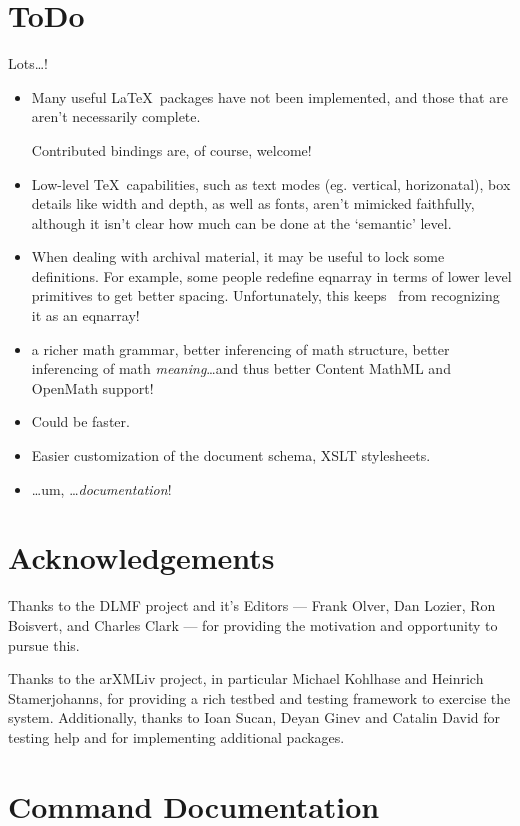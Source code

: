 \documentclass{book}
\begin{document}
\chapter{ToDo}\label{todo}
Lots\ldots!
\begin{itemize}
\item Many useful \LaTeX\ packages have not been implemented, and those
  that are aren't necessarily complete.

  Contributed bindings are, of course, welcome!
\item Low-level \TeX\ capabilities, such as text modes (eg. vertical, horizonatal),
 box details like width and depth, as well as fonts,  aren't mimicked faithfully,
  although it isn't clear how much can be done at the `semantic' level.
\item When dealing with archival material, it may be useful to lock some definitions.
  For example, some people redefine eqnarray in terms of lower level primitives
  to get better spacing. Unfortunately, this keeps \LaTeXML\ from recognizing it
  as an eqnarray!
\item a richer math grammar, better inferencing of math structure,
  better inferencing of math \emph{meaning}\ldots and thus better
  Content MathML and OpenMath support!
\item Could be faster.
\item Easier customization of the document schema, XSLT stylesheets.
\item \ldots um, \ldots \emph{documentation}!
\end{itemize}

\chapter*{Acknowledgements}\label{acknowledgements}
Thanks to the DLMF project and it's Editors ---
Frank Olver, Dan Lozier, Ron Boisvert, and Charles Clark ---
for providing the motivation and opportunity to pursue this.

Thanks to the arXMLiv project, in particular Michael Kohlhase and Heinrich Stamerjohanns,
for providing a rich testbed and testing framework to exercise the system.
Additionally, thanks to Ioan Sucan, Deyan Ginev
and Catalin David for testing help and for implementing additional packages.

\appendix
\chapter[Commands]{Command Documentation}\label{commands}



\end{document}
